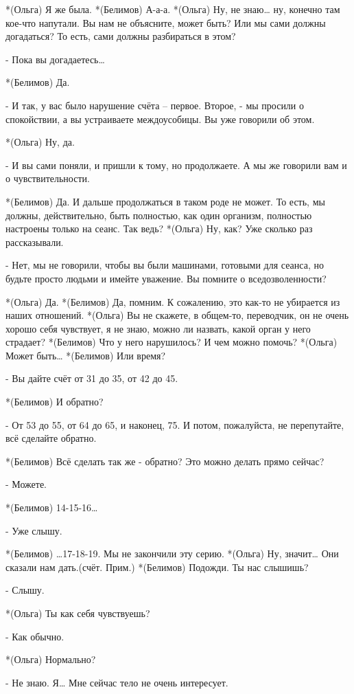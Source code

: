 *(Ольга) Я же была.
*(Белимов) А-а-а.
*(Ольга) Ну, не знаю… ну, конечно  там кое-что напутали. Вы нам не объясните, может быть? Или мы сами должны догадаться? То есть, сами должны разбираться в этом?

- Пока вы догадаетесь…

*(Белимов) Да.

- И так, у вас было нарушение счёта – первое. Второе, - мы просили о спокойствии, а вы устраиваете междоусобицы. Вы уже говорили об этом.

*(Ольга) Ну, да.

- И вы сами поняли, и пришли к тому, но продолжаете. А мы же говорили вам и о чувствительности.

*(Белимов) Да. И дальше продолжаться в таком роде не может. То есть, мы должны, действительно, быть полностью, как один организм, полностью настроены только на сеанс. Так ведь?
*(Ольга) Ну, как? Уже сколько раз рассказывали.

- Нет, мы не говорили, чтобы вы были машинами, готовыми для сеанса, но будьте просто людьми и имейте уважение. Вы помните о вседозволенности?

*(Ольга) Да.
*(Белимов) Да, помним. К сожалению, это как-то не убирается из наших отношений.
*(Ольга) Вы не скажете, в общем-то, переводчик, он не очень хорошо себя чувствует, я не знаю, можно ли назвать, какой орган у него страдает?
*(Белимов) Что у него нарушилось? И чем можно помочь?
*(Ольга) Может быть…
*(Белимов) Или время?

- Вы дайте счёт от 31 до 35, от 42 до 45.

*(Белимов) И обратно?

- От 53 до 55, от 64 до 65, и наконец, 75. И потом, пожалуйста, не перепутайте, всё сделайте обратно.

*(Белимов) Всё сделать так же - обратно? Это можно делать прямо сейчас?

- Можете.

*(Белимов) 14-15-16…

- Уже слышу.

*(Белимов) …17-18-19. Мы не закончили эту серию.
*(Ольга) Ну, значит… Они сказали нам дать.(счёт. Прим.)
*(Белимов) Подожди. Ты нас слышишь?

- Слышу.

*(Ольга) Ты как себя чувствуешь?

- Как обычно.

*(Ольга) Нормально?

- Не знаю. Я… Мне сейчас тело не очень интересует.

